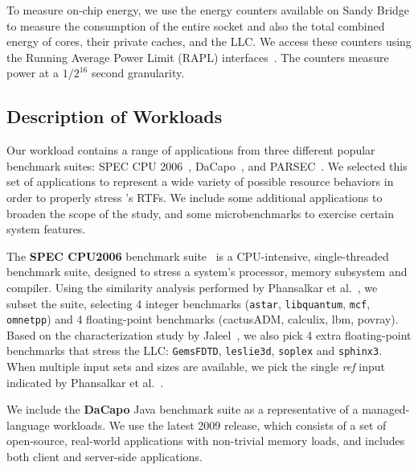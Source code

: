To measure on-chip energy, we use the energy counters available on
Sandy Bridge to measure the consumption of  the entire socket and also
the total combined energy of cores, their private caches, and the
LLC. We access these counters using the Running Average Power Limit
(RAPL) interfaces~\cite{Intel:Manual2012}.  The counters measure power
at a $1/2^{16}$ second granularity.


\subsection*{Description of Workloads}

Our workload contains a range of applications from three different
popular benchmark suites: SPEC CPU 2006~\cite{SPEC2006},
DaCapo~\cite{dacapo}, and PARSEC~\cite{parsec}. We selected this set of applications to represent a wide variety of possible resource behaviors in order to properly stress \pacora's RTFs. We include some additional applications to broaden the
scope of the study, and some microbenchmarks to exercise certain
system features.

The \textbf{SPEC CPU2006} benchmark suite~\cite{SPEC2006} is a
CPU-intensive, single-threaded benchmark suite, designed to stress a
system's processor, memory subsystem and compiler.  Using the
similarity analysis performed by Phansalkar et
al.~\cite{Phansalkar:ISCA2007}, we subset the suite, selecting 4
integer benchmarks ({\tt astar}, {\tt libquantum}, {\tt mcf}, {\tt omnetpp}) and 4
floating-point benchmarks (cactusADM, calculix, lbm, povray).  Based
on the characterization study by Jaleel~\cite{Jaleel:TR2007}, we also
pick 4 extra floating-point benchmarks that stress the LLC: {\tt GemsFDTD},
{\tt leslie3d}, {\tt soplex} and {\tt sphinx3}.  When multiple input sets and sizes are
available, we pick the single \textit{ref} input indicated by
Phansalkar et al.~\cite{Phansalkar:ISCA2007}. 

We include the \textbf{DaCapo} Java benchmark suite as a
representative of a managed-language workloads. We use the latest 2009 release, which consists of a set of open-source, real-world
applications with non-trivial memory loads, and includes both client and
server-side applications.

